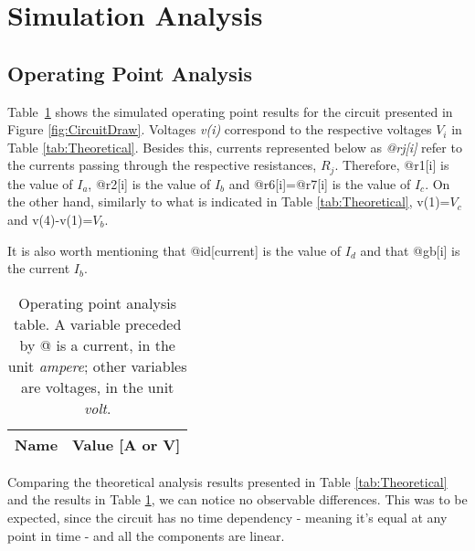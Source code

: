 \section{Simulation Analysis}
\label{sec:simulation}

\subsection{Operating Point Analysis}

Table~\ref{tab:op} shows the simulated operating point results for the circuit presented in Figure \ref{fig:CircuitDraw}. Voltages \textit{v(i)} correspond to the respective voltages $V_i$ in Table \ref{tab:Theoretical}. Besides this, currents represented below as \textit{@rj[i]} refer to the currents passing through the respective resistances, $R_j$. Therefore, @r1[i] is the value of $I_a$, @r2[i] is the value of $I_b$ and @r6[i]=@r7[i] is the value of $I_c$. On the other hand, similarly to what is indicated in Table \ref{tab:Theoretical}, v(1)=$V_c$ and v(4)-v(1)=$V_b$.

\par

It is also worth mentioning that @id[current] is the value of $I_d$ and that @gb[i] is the current $I_b$.

\begin{table}[H]
  \centering
  \begin{tabular}{|c|c|}
    \hline    
    {\bf Name} & {\bf Value [A or V]} \\ \hline
    
  \end{tabular}
  \caption{Operating point analysis table. A variable preceded by @ is a current, in the unit \textit{ampere}; other variables are voltages, in the unit \textit{volt}.}
  \label{tab:op}
\end{table}

Comparing the theoretical analysis results presented in Table \ref{tab:Theoretical} and the results in Table \ref{tab:op}, we can notice no observable differences. This was to be expected, since the circuit has no time dependency - meaning it's equal at any point in time - and all the components are linear.
